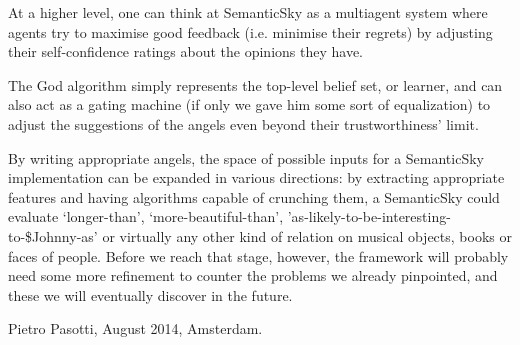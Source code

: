 \documentclass[11pt]{article}
\begin{document}
At a higher level, one can think at SemanticSky as a multiagent system where agents try to maximise good feedback (i.e. minimise their regrets) by adjusting their self-confidence ratings about the opinions they have.

The God algorithm simply represents the top-level belief set, or learner, and can also act as a gating machine (if only we gave him some sort of equalization) to adjust the suggestions of the angels even beyond their trustworthiness' limit.

By writing appropriate angels, the space of possible inputs for a SemanticSky implementation can be expanded in various directions: by extracting appropriate features and having algorithms capable of crunching them, a SemanticSky could evaluate `longer-than', `more-beautiful-than', 'as-likely-to-be-interesting-to-\$Johnny-as' or virtually any other kind of relation on musical objects, books or faces of people. Before we reach that stage, however, the framework will probably need some more refinement to counter the problems we already pinpointed, and these we will eventually discover in the future.

\flushright Pietro Pasotti, August 2014, Amsterdam.
\end{document}
